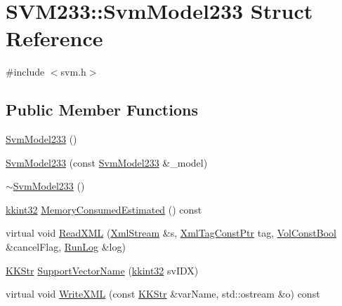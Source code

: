 \hypertarget{struct_s_v_m233_1_1_svm_model233}{}\section{S\+V\+M233\+:\+:Svm\+Model233 Struct Reference}
\label{struct_s_v_m233_1_1_svm_model233}


{\ttfamily \#include $<$svm.\+h$>$}

\subsection*{Public Member Functions}
\begin{DoxyCompactItemize}
\item 
\hyperlink{struct_s_v_m233_1_1_svm_model233_a67c96f5c91cbeccfe31b480229e54045}{Svm\+Model233} ()
\item 
\hyperlink{struct_s_v_m233_1_1_svm_model233_ab79e72c814908c10b737f6a30d2c524f}{Svm\+Model233} (const \hyperlink{struct_s_v_m233_1_1_svm_model233}{Svm\+Model233} \&\+\_\+model)
\item 
\hyperlink{struct_s_v_m233_1_1_svm_model233_acf11d68a70d57a8d6d6184d58194e618}{$\sim$\+Svm\+Model233} ()
\item 
\hyperlink{namespace_k_k_b_a8fa4952cc84fda1de4bec1fbdd8d5b1b}{kkint32} \hyperlink{struct_s_v_m233_1_1_svm_model233_ad4c875fdeca568622f1d72918e39bb78}{Memory\+Consumed\+Estimated} () const 
\item 
virtual void \hyperlink{struct_s_v_m233_1_1_svm_model233_acec81e759967bdfa542e80b21500f977}{Read\+X\+ML} (\hyperlink{class_k_k_b_1_1_xml_stream}{Xml\+Stream} \&s, \hyperlink{namespace_k_k_b_a5f1b0b1667d79fec26deeff10c43df23}{Xml\+Tag\+Const\+Ptr} tag, \hyperlink{namespace_k_k_b_a7d390f568e2831fb76b86b56c87bf92f}{Vol\+Const\+Bool} \&cancel\+Flag, \hyperlink{class_k_k_b_1_1_run_log}{Run\+Log} \&log)
\item 
\hyperlink{class_k_k_b_1_1_k_k_str}{K\+K\+Str} \hyperlink{struct_s_v_m233_1_1_svm_model233_aa21a0480268196554d0976bf73d059ed}{Support\+Vector\+Name} (\hyperlink{namespace_k_k_b_a8fa4952cc84fda1de4bec1fbdd8d5b1b}{kkint32} sv\+I\+DX)
\item 
virtual void \hyperlink{struct_s_v_m233_1_1_svm_model233_ab2d4f8e127af93158ca436d080e80f85}{Write\+X\+ML} (const \hyperlink{class_k_k_b_1_1_k_k_str}{K\+K\+Str} \&var\+Name, std\+::ostream \&o) const 
\end{DoxyCompactItemize}
